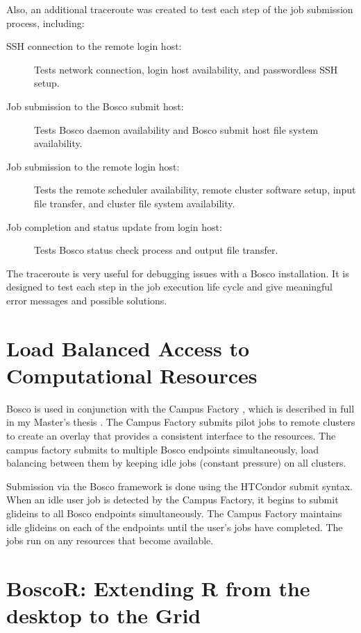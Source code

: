 \label{sec:boscotraceroute}

Also, an additional traceroute was created to test each step of the job submission process, including:

\begin{description}
\item[SSH connection to the remote login host:]  Tests network connection, login host availability, and passwordless SSH setup.
\item[Job submission to the Bosco submit host:]  Tests Bosco daemon availability and Bosco submit host file system availability.
\item[Job submission to the remote login host:]  Tests the remote scheduler availability, remote cluster software setup, input file transfer, and cluster file system availability.
\item[Job completion and status update from login host:]  Tests Bosco status check process and output file transfer.
\end{description}

The traceroute is very useful for debugging issues with a Bosco installation.  It is designed to test each step in the job execution life cycle and give meaningful error messages and possible solutions.

\section{Load Balanced Access to Computational Resources}

Bosco is used in conjunction with the Campus Factory \cite{website:campusfactory}, which is described in full in my Master's thesis \cite{weitzel2011campus}.  The Campus Factory submits pilot jobs to remote clusters to create an overlay that provides a consistent interface to the resources.  The campus factory submits to multiple Bosco endpoints simultaneously, load balancing between them by keeping idle jobs (constant pressure) on all clusters.

Submission via the Bosco framework is done using the HTCondor submit syntax.  When an idle user job is detected by the Campus Factory, it begins to submit glideins to all Bosco endpoints simultaneously.  The Campus Factory maintains idle glideins on each of the endpoints until the user's jobs have completed.  The jobs run on any resources that become available.


\section{BoscoR: Extending R from the desktop to the Grid}

